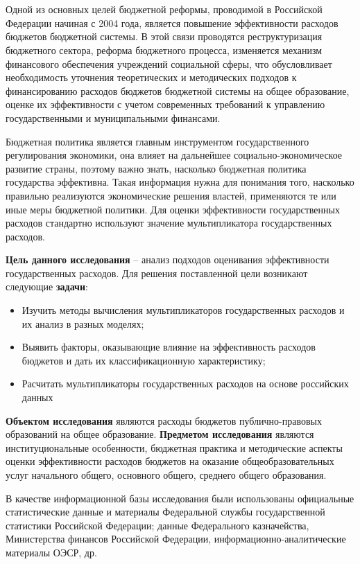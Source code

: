 \documentclass[12pt, a4paper]{extarticle}
\newcommand*{\sectionformat}{\centering}
\begin{document}
  \newpage
    \tableofcontents
  \newpage

  \section*{\sectionformat {Введение}}
\par
    Одной из основных целей бюджетной реформы, проводимой в Российской Федерации начиная с 2004 года, является повышение эффективности расходов бюджетов бюджетной системы. В этой связи проводятся реструктуризация бюджетного сектора, реформа бюджетного процесса, изменяется механизм финансового обеспечения учреждений социальной сферы, что обусловливает необходимость уточнения теоретических и методических подходов к финансированию расходов бюджетов бюджетной системы на общее образование, оценке их эффективности с учетом современных требований к управлению государственными и муниципальными финансами.
\par
    Бюджетная политика является главным инструментом государственного регулирования экономики, она влияет на дальнейшее социально-экономическое развитие страны, поэтому важно знать, насколько бюджетная политика государства эффективна. Такая информация нужна для понимания того, насколько правильно реализуются экономические решения властей, применяются те или иные меры бюджетной политики. Для оценки эффективности государственных расходов стандартно используют значение мультипликатора государственных расходов.
\par
    \textbf{Цель данного исследования} -- анализ подходов оценивания эффективности государственных расходов. Для решения поставленной цели возникают следующие \textbf{задачи}:
  
  \begin{itemize}
    \renewcommand\labelitemi{--}
    \item Изучить методы вычисления мультипликаторов государственных расходов и их анализ в разных моделях;
    \item Выявить факторы, оказывающие влияние на эффективность расходов бюджетов и дать их классификационную характеристику;
    \item Расчитать мультипликаторы государственных расходов на основе российских данных
  \end{itemize}
\par
    \textbf{Объектом исследования} являются расходы бюджетов публично-правовых образований на общее образование. \textbf{Предметом исследования} являются институциональные особенности, бюджетная практика и методические аспекты оценки эффективности расходов бюджетов на оказание общеобразовательных услуг начального общего, основного общего, среднего общего образования.
\par
    В качестве информационной базы исследования были использованы официальные статистические данные и материалы Федеральной службы государственной статистики Российской Федерации; данные Федерального казначейства, Министерства финансов Российской Федерации, информационно-аналитические материалы ОЭСР, др.
\end{document}
